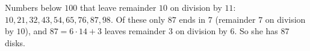 Numbers below $100$ that leave remainder $10$ on division by $11$: $10,21,32,43,54,65,76,87,98$. Of these only $87$ ends in $7$ (remainder $7$ on division by $10$), and $87=6\cdot14+3$ leaves remainder $3$ on division by $6$. So she has $\boxed{87}$ disks.
